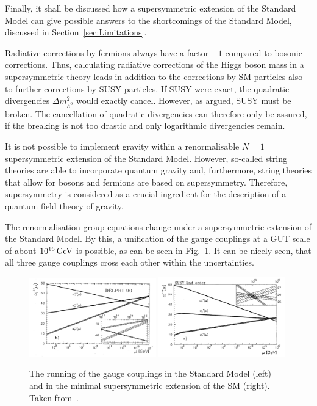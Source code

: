 Finally, it shall be discussed how a supersymmetric extension of the Standard Model can give possible answers to the shortcomings of the Standard Model, discussed in Section~\ref{sec:Limitations}.

Radiative corrections by fermions always have a factor $-1$ compared to bosonic corrections.
Thus, calculating radiative corrections of the Higgs boson mass in a supersymmetric theory leads in addition to the corrections by SM particles also to further corrections by SUSY particles.
If SUSY were exact, the quadratic divergencies $\Delta m^2_{h^0}$ would exactly cancel. 
However, as argued, SUSY must be broken.
The cancellation of quadratic divergencies can therefore only be assured, if the breaking is not too drastic and only logarithmic divergencies remain.

It is not possible to implement gravity within a renormalisable $N=1$ supersymmetric extension of the Standard Model.
However, so-called string theories are able to incorporate quantum gravity and, furthermore, string theories that allow for bosons and fermions are based on supersymmetry.
Therefore, supersymmetry is considered as a crucial ingredient for the description of a quantum field theory of gravity.


The renormalisation group equations change under a supersymmetric extension of the Standard Model.
By this, a unification of the gauge couplings at a GUT scale of about $10^{16}\,\text{Ge}\kern-0.06667em\text{V}$ is possible, as can be seen in Fig.~\ref{fig:Unification}.
It can be nicely seen, that all three gauge couplings cross each other within the uncertainties.
\begin{figure}[!t]
  \centering
      \includegraphics[width=0.49\textwidth]{figures/theory/running_couplings_SM}
      \includegraphics[width=0.49\textwidth]{figures/theory/running_couplings_MSSM}
  \caption{The running of the gauge couplings in the Standard Model (left) and in the minimal supersymmetric extension of the SM (right). Taken from~\cite{bib:Unification}.}  
  \label{fig:Unification}
\end{figure}

